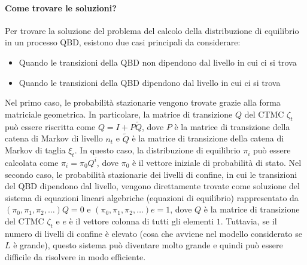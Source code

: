 \documentclass[11pt]{article}
\begin{document}
\paragraph{Come trovare le soluzioni?}Per trovare la soluzione del problema del calcolo della distribuzione di equilibrio in un processo QBD, esistono due casi principali da considerare:
\begin{itemize}
    \item Quando le transizioni della QBD non dipendono dal livello in cui ci si trova
    \item Quando le transizioni della QBD dipendono dal livello in cui ci si trova
\end{itemize}
Nel primo caso, le probabilità stazionarie vengono trovate grazie alla forma matriciale geometrica. In particolare, la matrice di transizione $Q$ del CTMC $\zeta_t$ può essere riscritta come $Q = I + P\tilde{Q}$, dove $P$ è la matrice di transizione della catena di Markov di livello $n_t$ e $\tilde{Q}$ è la matrice di transizione della catena di Markov di taglia $\xi_t$. In questo caso, la distribuzione di equilibrio $\pi_i$ può essere calcolata come $\pi_i = \pi_0 Q^i$, dove $\pi_0$ è il vettore iniziale di probabilità di stato. Nel secondo caso, le probabilità stazionarie dei livelli di confine, in cui le transizioni del QBD dipendono dal livello, vengono direttamente trovate come soluzione del sistema di equazioni lineari algebriche (equazioni di equilibrio) rappresentato da $(\pi_0, \pi_1, \pi_2, \dots)Q = 0$ e $(\pi_0, \pi_1, \pi_2, \dots)e = 1$, dove $Q$ è la matrice di transizione del CTMC $\zeta_t$ e $e$ è il vettore colonna di tutti gli elementi $1$. Tuttavia, se il numero di livelli di confine è elevato (cosa che avviene nel modello considerato se $L$ è grande), questo sistema può diventare molto grande e quindi può essere difficile da risolvere in modo efficiente. \vspace{0.5cm}
\end{document}
